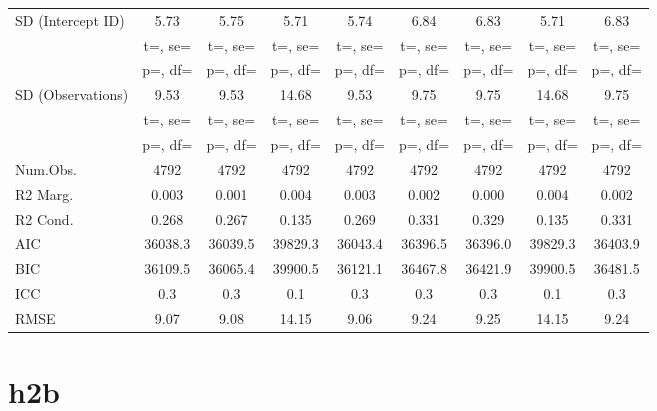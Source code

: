 \documentclass[]{report}
\begin{document}
\begin{table}
{\begin{tabular}[t]{lcccccccc}
		SD (Intercept ID) & \num{5.73} & \num{5.75} & \num{5.71} & \num{5.74} & \num{6.84} & \num{6.83} & \num{5.71} & \num{6.83}\\
		& t=, se= & t=, se= & t=, se= & t=, se= & t=, se= & t=, se= & t=, se= & t=, \vphantom{1} se=\\
		& p=, df= & p=, df= & p=, df= & p=, df= & p=, df= & p=, df= & p=, df= & p=, \vphantom{1} df=\\
		SD (Observations) & \num{9.53} & \num{9.53} & \num{14.68} & \num{9.53} & \num{9.75} & \num{9.75} & \num{14.68} & \num{9.75}\\
		& t=, se= & t=, se= & t=, se= & t=, se= & t=, se= & t=, se= & t=, se= & t=, se=\\
		& p=, df= & p=, df= & p=, df= & p=, df= & p=, df= & p=, df= & p=, df= & p=, df=\\
		\midrule
		Num.Obs. & \num{4792} & \num{4792} & \num{4792} & \num{4792} & \num{4792} & \num{4792} & \num{4792} & \num{4792}\\
		R2 Marg. & \num{0.003} & \num{0.001} & \num{0.004} & \num{0.003} & \num{0.002} & \num{0.000} & \num{0.004} & \num{0.002}\\
		R2 Cond. & \num{0.268} & \num{0.267} & \num{0.135} & \num{0.269} & \num{0.331} & \num{0.329} & \num{0.135} & \num{0.331}\\
		AIC & \num{36038.3} & \num{36039.5} & \num{39829.3} & \num{36043.4} & \num{36396.5} & \num{36396.0} & \num{39829.3} & \num{36403.9}\\
		BIC & \num{36109.5} & \num{36065.4} & \num{39900.5} & \num{36121.1} & \num{36467.8} & \num{36421.9} & \num{39900.5} & \num{36481.5}\\
		ICC & \num{0.3} & \num{0.3} & \num{0.1} & \num{0.3} & \num{0.3} & \num{0.3} & \num{0.1} & \num{0.3}\\
		RMSE & \num{9.07} & \num{9.08} & \num{14.15} & \num{9.06} & \num{9.24} & \num{9.25} & \num{14.15} & \num{9.24}\\
		\bottomrule
	\end{tabular}}
\end{table}


\section{h2b}
\end{document}
